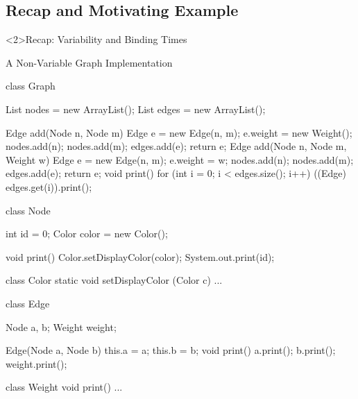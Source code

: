 


\subsection{Recap and Motivating Example}

\begin{frame}<2>{Recap: Variability and Binding Times}
	\frameVariabilityAndBindingTimes
\end{frame}

\begin{frame}[fragile]{A Non-Variable Graph Implementation}
	\small
	\begin{mycolumns}[t,columns=3,widths={43,30,32}]
\begin{codetight}{}
class Graph {
	List nodes = new ArrayList();
	List edges = new ArrayList();

	Edge add(Node n, Node m) {
		Edge e = new Edge(n, m);
		e.weight = new Weight();
		nodes.add(n); nodes.add(m); edges.add(e);
		return e;
	}
	Edge add(Node n, Node m, Weight w) {
		Edge e = new Edge(n, m);
		e.weight = w;
		nodes.add(n); nodes.add(m); edges.add(e);
		return e;
	}
	void print() {
		for (int i = 0; i < edges.size(); i++) {
			((Edge) edges.get(i)).print();
		}
	}
}
\end{codetight}
	\mynextcolumn
\begin{codetight}{}
class Node {
	int id = 0;
	Color color = new Color();

	void print() {
		Color.setDisplayColor(color);
		System.out.print(id);
	}
}
\end{codetight}
\begin{codetight}{}
class Color {
	static void setDisplayColor
		(Color c) {...}
}
\end{codetight}
	\mynextcolumn
\begin{codetight}{}
class Edge {
	Node a, b;
	Weight weight;

	Edge(Node a, Node b) {
		this.a = a; this.b = b;
	}
	void print() {
		a.print(); b.print();
		weight.print();
	}
}
\end{codetight}
\begin{codetight}{}
class Weight {
	void print() {...}
}
\end{codetight}
	\end{mycolumns}
\end{frame}

